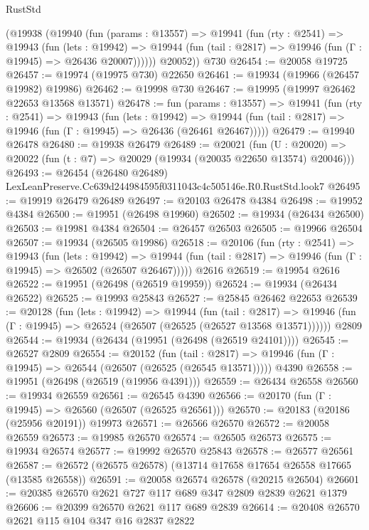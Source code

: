 \begin{lexlean}{RustStd}
\begin{coremodule}
      (@19938
        (@19940
          (fun (params : @13557) =>
          @19941
            (fun (rty : @2541) =>
            @19943
              (fun (lets : @19942) =>
              @19944 (fun (tail : @2817) => @19946 (fun (Γ : @19945) => @26436 @20007))))))
        @20052))
    @730
@26454 := @20058 @19725
@26457 := @19974 (@19975 @730) @22650
@26461 := @19934 (@19966 (@26457 @19982) @19986)
@26462 := @19998 @730
@26467 := @19995 (@19997 @26462 @22653 @13568 @13571)
@26478 := fun (params : @13557) =>
  @19941
    (fun (rty : @2541) =>
    @19943
      (fun (lets : @19942) =>
      @19944 (fun (tail : @2817) => @19946 (fun (Γ : @19945) => @26436 (@26461 @26467)))))
@26479 := @19940 @26478
@26480 := @19938 @26479
@26489 := @20021
    (fun (U : @20020) => @20022 (fun (t : @7) => @20029 (@19934 (@20035 @22650 @13574) @20046)))
@26493 := @26454 (@26480 @26489) LexLeanPreserve.Cc639d244984595f0311043c4c505146e.R0.RustStd.look7
@26495 := @19919 @26479 @26489
@26497 := @20103 @26478 @4384
@26498 := @19952 @4384
@26500 := @19951 (@26498 @19960)
@26502 := @19934 (@26434 @26500)
@26503 := @19981 @4384
@26504 := @26457 @26503
@26505 := @19966 @26504
@26507 := @19934 (@26505 @19986)
@26518 := @20106
    (fun (rty : @2541) =>
    @19943
      (fun (lets : @19942) =>
      @19944 (fun (tail : @2817) => @19946 (fun (Γ : @19945) => @26502 (@26507 @26467)))))
    @2616
@26519 := @19954 @2616
@26522 := @19951 (@26498 (@26519 @19959))
@26524 := @19934 (@26434 @26522)
@26525 := @19993 @25843
@26527 := @25845 @26462 @22653
@26539 := @20128
    (fun (lets : @19942) =>
    @19944
      (fun (tail : @2817) =>
      @19946 (fun (Γ : @19945) => @26524 (@26507 (@26525 (@26527 @13568 @13571))))))
    @2809
@26544 := @19934 (@26434 (@19951 (@26498 (@26519 @24101))))
@26545 := @26527 @2809
@26554 := @20152
    (fun (tail : @2817) => @19946 (fun (Γ : @19945) => @26544 (@26507 (@26525 (@26545 @13571)))))
    @4390
@26558 := @19951 (@26498 (@26519 (@19956 @4391)))
@26559 := @26434 @26558
@26560 := @19934 @26559
@26561 := @26545 @4390
@26566 := @20170 (fun (Γ : @19945) => @26560 (@26507 (@26525 @26561)))
@26570 := @20183 (@20186 (@25956 @20191)) @19973
@26571 := @26566 @26570
@26572 := @20058 @26559
@26573 := @19985 @26570
@26574 := @26505 @26573
@26575 := @19934 @26574
@26577 := @19992 @26570 @25843
@26578 := @26577 @26561
@26587 := @26572 (@26575 @26578) (@13714 @17658 @17654 @26558 @17665 (@13585 @26558))
@26591 := @20058 @26574 @26578 (@20215 @26504)
@26601 := @20385 @26570 @2621 @727 @117 @689 @347 @2809 @2839 @2621 @1379
@26606 := @20399 @26570 @2621 @117 @689 @2839
@26614 := @20408 @26570 @2621 @115 @104 @347 @16 @2837 @2822

\end{coremodule}
\end{lexlean}
